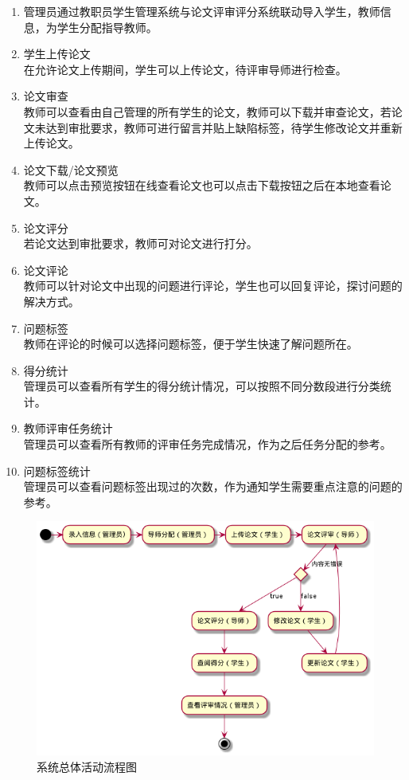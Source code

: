 \begin{enumerate}
    \item 管理员通过教职员学生管理系统与论文评审评分系统联动导入学生，教师信息，为学生分配指导教师。
    \item 学生上传论文\\
          在允许论文上传期间，学生可以上传论文，待评审导师进行检查。
    \item 论文审查\\
          教师可以查看由自己管理的所有学生的论文，教师可以下载并审查论文，若论文未达到审批要求，教师可进行留言并贴上缺陷标签，待学生修改论文并重新上传论文。
    \item 论文下载/论文预览\\
          教师可以点击预览按钮在线查看论文也可以点击下载按钮之后在本地查看论文。
    \item 论文评分\\
          若论文达到审批要求，教师可对论文进行打分。
    \item 论文评论\\
          教师可以针对论文中出现的问题进行评论，学生也可以回复评论，探讨问题的解决方式。
    \item 问题标签\\
          教师在评论的时候可以选择问题标签，便于学生快速了解问题所在。
    \item 得分统计\\
          管理员可以查看所有学生的得分统计情况，可以按照不同分数段进行分类统计。
    \item 教师评审任务统计\\
          管理员可以查看所有教师的评审任务完成情况，作为之后任务分配的参考。
    \item 问题标签统计\\
          管理员可以查看问题标签出现过的次数，作为通知学生需要重点注意的问题的参考。

\end{enumerate}

\begin{figure}[htbp]
    \centering
    \includegraphics[scale = 0.6]{out/uml/流程图/系统总体活动流程图/系统总体活动流程图.png}
    \caption{\song\wuhao 系统总体活动流程图}
\end{figure}


